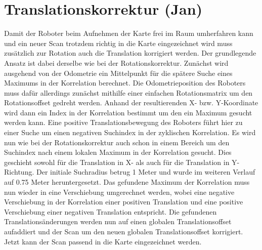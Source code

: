 \section{Translationskorrektur (Jan)}

Damit der Roboter beim Aufnehmen der Karte frei im Raum umherfahren kann und ein neuer Scan trotzdem richtig in die Karte eingezeichnet wird muss zusätzlich zur Rotation auch die Translation korrigiert werden. Der grundlegende Ansatz ist dabei derselbe wie bei der Rotationskorrektur. Zunächst wird ausgehend von der Odometrie ein Mittelpunkt für die spätere Suche eines Maximums in der Korrelation berechnet. Die Odometrieposition des Roboters muss dafür allerdings zunächst mithilfe einer einfachen Rotationsmatrix um den Rotationsoffset gedreht werden. Anhand der resultierenden X- bzw. Y-Koordinate wird dann ein Index in der Korrelation bestimmt um den ein Maximum gesucht werden kann. Eine positive Translationsbewegung des Roboters führt hier zu einer Suche um einen negativen Suchindex in der zyklischen Korrelation.
Es wird nun wie bei der Rotationskorrektur auch schon in einem Bereich um den Suchindex nach einem lokalen Maximum in der Korrelation gesucht. Dies geschieht sowohl für die Translation in X- als auch für die Translation in Y-Richtung. Der initiale Suchradius betrug 1 Meter und wurde im weiteren Verlauf auf 0.75 Meter heruntergesetzt.
Das gefundene Maximum der Korrelation muss nun wieder in eine Verschiebung umgerechnet werden, wobei eine negative Verschiebung in der Korrelation einer positiven Translation und eine positive Verschiebung einer negativen Translation entspricht.
Die gefundenen Translationsänderungen werden nun auf einen globalen Translationsoffset aufaddiert und der Scan um den neuen globalen Translationsoffset korrigiert.
Jetzt kann der Scan passend in die Karte eingezeichnet werden.

